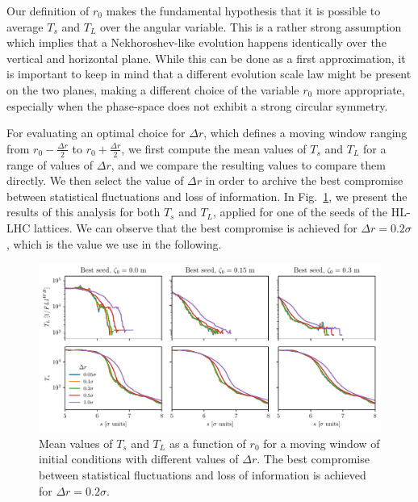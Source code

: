 Our definition of $r_0$ makes the fundamental hypothesis that it is possible to average $T_s$ and $T_L$ over the angular variable. This is a rather strong assumption which implies that a Nekhoroshev-like evolution happens identically over the vertical and horizontal plane. While this can be done as a first approximation, it is important to keep in mind that a different evolution scale law might be present on the two planes, making a different choice of the variable $r_0$ more appropriate, especially when the phase-space does not exhibit a strong circular symmetry.

For evaluating an optimal choice for $\Delta r$, which defines a moving window ranging from $r_0 - \frac{\Delta r}{2}$ to $r_0 + \frac{\Delta r}{2}$, we first compute the mean values of $T_s$ and $T_L$ for a range of values of $\Delta r$, and we compare the resulting values to compare them directly. We then select the value of $\Delta r$ in order to archive the best compromise between statistical fluctuations and loss of information. In Fig.~\ref{fig:ts_vs_r0}, we present the results of this analysis for both $T_s$ and $T_L$, applied for one of the seeds of the HL-LHC lattices. We can observe that the best compromise is achieved for $\Delta r = 0.2\sigma$, which is the value we use in the following.

\begin{figure}
    \centering
    \includegraphics[width=1\textwidth]{6_lhc_dynamic_indicators/figs/lyapunov_time_vs_thickness.pdf}
    \caption{Mean values of $T_s$ and $T_L$ as a function of $r_0$ for a moving window of initial conditions with different values of $\Delta r$. The best compromise between statistical fluctuations and loss of information is achieved for $\Delta r = 0.2\sigma$.}
    \label{fig:ts_vs_r0}
\end{figure}

